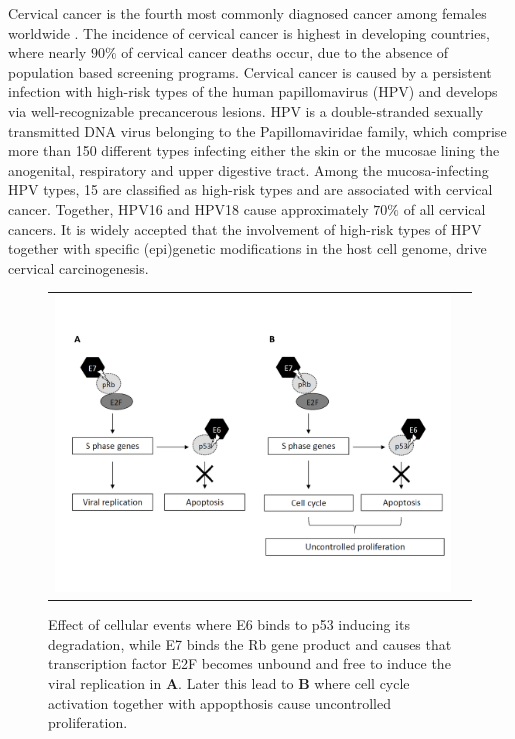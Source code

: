Cervical cancer is the fourth most commonly diagnosed cancer among females worldwide \cite{Ferlay2015}. The incidence of cervical cancer is highest in developing countries, where nearly $90\%$ of cervical cancer deaths occur, due to the absence of population based screening programs. Cervical cancer is caused by a persistent infection with high-risk types of the human papillomavirus (HPV) and develops via well-recognizable precancerous lesions. HPV is a double-stranded sexually transmitted DNA virus belonging to the Papillomaviridae family, which comprise more than 150 different types infecting either the skin or the mucosae lining the anogenital, respiratory and upper digestive tract. Among the mucosa-infecting HPV types, 15 are classified as high-risk types and are associated with cervical cancer. Together, HPV16 and HPV18 cause approximately $70\%$ of all cervical cancers. It is widely accepted that the involvement of high-risk types of HPV together with specific (epi)genetic modifications in the host cell genome, drive cervical carcinogenesis. 

\begin{figure}[h!]
\centering
\begin{tabular}{cc}
\includegraphics[scale=0.6]{viral2.pdf}\\
\end{tabular}
\caption{Effect of cellular events where E6 binds to p53 inducing its degradation, while E7 binds the Rb gene product and causes that transcription factor E2F becomes unbound and free to induce the viral replication in \textbf{A}. Later this lead to \textbf{B} where cell cycle activation together with appopthosis cause uncontrolled proliferation.}
\label{fig:viral}
\end{figure}

